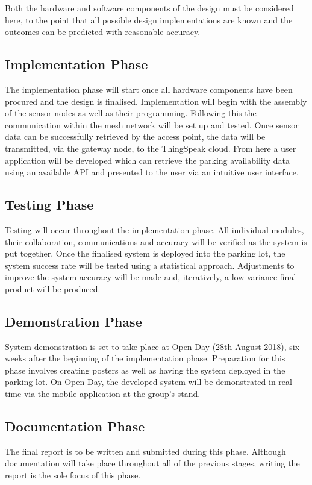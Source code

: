 \documentclass[10pt,twocolumn]{witseiepaper}
\begin{document}
		Both the hardware and software components of the design must be considered here, to the point that all possible design implementations are known and the outcomes can be predicted with reasonable accuracy. 
	
	\subsection{Implementation Phase}
		The implementation phase will start once all hardware components have been procured and the design is finalised. Implementation will begin with the assembly of the sensor nodes as well as their programming. Following this the communication within the mesh network will be set up and tested. Once sensor data can be successfully retrieved by the access point, the data will be transmitted, via the gateway node, to the ThingSpeak cloud. From here a user application will be developed which can retrieve the parking availability data using an available API and presented to the user via an intuitive user interface.
	
	\subsection{Testing Phase}
		Testing will occur throughout the implementation phase. All individual modules, their collaboration, communications and accuracy will be verified as the system is put together. Once the finalised system is deployed into the parking lot, the system success rate will be tested using a statistical approach. Adjustments to improve the system accuracy will be made and, iteratively, a low variance final product will be produced.
		
	\subsection{Demonstration Phase}
		System demonstration is set to take place at Open Day (28th August 2018), six weeks after the beginning of the implementation phase. Preparation for this phase involves creating posters as well as having the system deployed in the parking lot. On Open Day, the developed system will be demonstrated in real time via the mobile application at the group's stand.
	
	\subsection{Documentation Phase}
		The final report is to be written and submitted during this phase. Although documentation will take place throughout all of the previous stages, writing the report is the sole focus of this phase.
	
\end{document}
